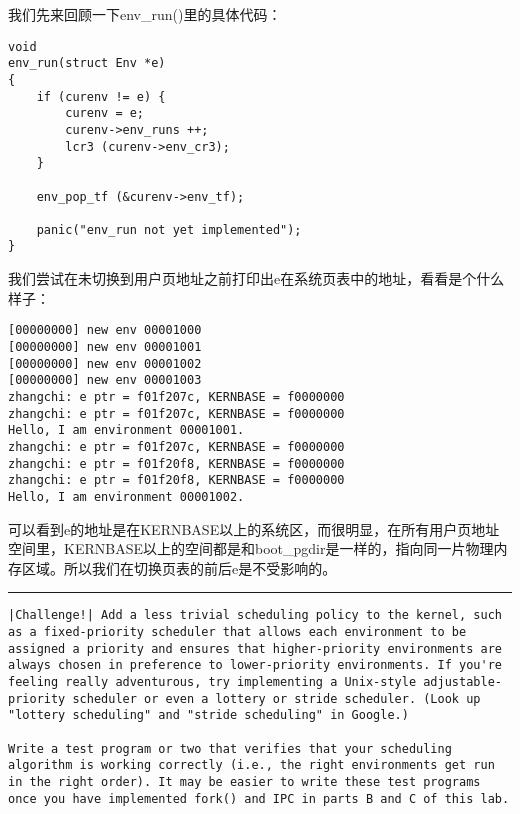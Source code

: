 \documentclass{article}
\newcommand{\funcname}[1]{{\ttfamily \small #1}}
\begin{document}
\begin{CJK*}{UTF8}{gkai}
我们先来回顾一下\funcname{env\_run()}里的具体代码：


\begin{lstlisting}[style=ccode, title={\scriptsize \ttfamily \bfseries kern/env.c: env\_run()}]
void
env_run(struct Env *e)
{
    if (curenv != e) {
        curenv = e;
        curenv->env_runs ++;
        lcr3 (curenv->env_cr3);
    }

    env_pop_tf (&curenv->env_tf);

    panic("env_run not yet implemented");
}
\end{lstlisting}

我们尝试在未切换到用户页地址之前打印出e在系统页表中的地址，看看是个什么样子：

\begin{lstlisting}[style=console]
[00000000] new env 00001000
[00000000] new env 00001001
[00000000] new env 00001002
[00000000] new env 00001003
zhangchi: e ptr = f01f207c, KERNBASE = f0000000
zhangchi: e ptr = f01f207c, KERNBASE = f0000000
Hello, I am environment 00001001.
zhangchi: e ptr = f01f207c, KERNBASE = f0000000
zhangchi: e ptr = f01f20f8, KERNBASE = f0000000
zhangchi: e ptr = f01f20f8, KERNBASE = f0000000
Hello, I am environment 00001002.
\end{lstlisting}

可以看到e的地址是在KERNBASE以上的系统区，而很明显，在所有用户页地址空间里，KERNBASE以上的空间都是和boot\_pgdir是一样的，指向同一片物理内存区域。所以我们在切换页表的前后e是不受影响的。

\vspace{2em}
\hrule
\vspace{2em}

\begin{lstlisting}[style=challenge]
|Challenge!| Add a less trivial scheduling policy to the kernel, such as a fixed-priority scheduler that allows each environment to be assigned a priority and ensures that higher-priority environments are always chosen in preference to lower-priority environments. If you're feeling really adventurous, try implementing a Unix-style adjustable-priority scheduler or even a lottery or stride scheduler. (Look up "lottery scheduling" and "stride scheduling" in Google.)

Write a test program or two that verifies that your scheduling algorithm is working correctly (i.e., the right environments get run in the right order). It may be easier to write these test programs once you have implemented fork() and IPC in parts B and C of this lab.
\end{lstlisting}


\end{CJK*}
\end{document}
